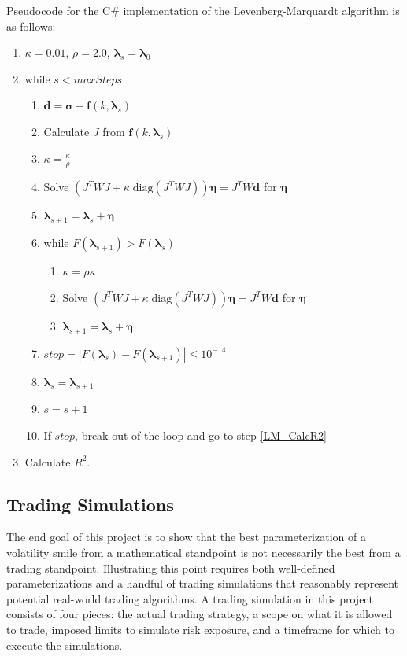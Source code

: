 \documentclass[12pt, a4paper, notitlepage]{article}
\numberwithin{equation}{subsection}
\numberwithin{figure}{subsection}
\numberwithin{table}{subsection}
\newcommand{\lambdaVect}{\pmb{\lambda}}
\begin{document}
Pseudocode for the C\# implementation of the Levenberg-Marquardt algorithm is as follows:

\begin{enumerate}
	\item $\kappa = 0.01$, $\rho = 2.0$, $\lambdaVect_s = \lambdaVect_0$
	\item while $s < maxSteps$
    	\begin{enumerate}
        	\item $\pmb{d} = \pmb{\sigma} - \pmb{f}(k, \pmb{\lambda}_{s})$
            \item Calculate $J$ from $\pmb{f}(k, \pmb{\lambda}_{s})$
            \item $\kappa = \frac{\kappa}{\rho}$
            \item Solve $\left(J^{T} W J + \kappa \; \text{diag}(J^{T} W J)\right) \pmb{\eta} = J^{T} W \pmb{d}$ for $\pmb{\eta}$
            \item $\lambdaVect_{s+1} = \pmb{\lambda}_{s} + \pmb{\eta}$
            \item while $F(\lambdaVect_{s+1}) > F(\pmb{\lambda}_{s})$
                    \begin{enumerate}
                        \item $\kappa = \rho \kappa$              
                        \item Solve $\left(J^{T} W J + \kappa \; \text{diag}(J^{T} W J)\right) \pmb{\eta} = J^{T} W \pmb{d}$ for $\pmb{\eta}$
                        \item $\lambdaVect_{s+1} = \pmb{\lambda}_{s} + \pmb{\eta}$
                    \end{enumerate}
            \item $stop = |F(\lambdaVect_{s}) - F(\lambdaVect_{s+1})| \leq 10^{-14}$
            \item $\pmb{\lambda}_{s} = \lambdaVect_{s+1}$
            \item $s = s + 1$
            \item If $stop$, break out of the loop and go to step \ref{LM_CalcR2}
    	\end{enumerate}
   \item Calculate $R^2$. \label{LM_CalcR2}
\end{enumerate}

\subsection{Trading Simulations}\label{sec:TradingStrategies}
The end goal of this project is to show that the best parameterization of a volatility smile from a mathematical standpoint is not necessarily the best from a trading standpoint.  Illustrating this point requires both well-defined parameterizations and a handful of trading simulations that reasonably represent potential real-world trading algorithms.  A trading simulation in this project consists of four pieces: the actual trading strategy, a scope on what it is allowed to trade, imposed limits to simulate risk exposure, and a timeframe for which to execute the simulations.
\end{document}
